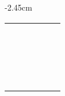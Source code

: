 \begin{center}
\begin{adjustwidth}{-2.45cm}{}
\begin{tabular}{|c c c c c c|}
             &  &  &  &  &  \\
             &  &  &  &  &  \\
             &  &  &  &  &  \\
             &  &  &  &  &  \\
             &  &  &  &  &  \\
             &  &  &  &  &  \\
             &  &  &  &  &  \\
             &  &  &  &  &  \\
             &  &  &  &  &  \\
             &  &  &  &  &  \\
             &  &  &  &  &  \\
             &  &  &  &  &  \\
             &  &  &  &  &  \\
             &  &  &  &  &  \\
             &  &  &  &  &  \\
             &  &  &  &  &  \\
             &  &  &  &  &  \\
             &  &  &  &  &  \\
             &  &  &  &  &  \\
            \hline
        \end{tabular}
    \end{adjustwidth}
\end{center}


